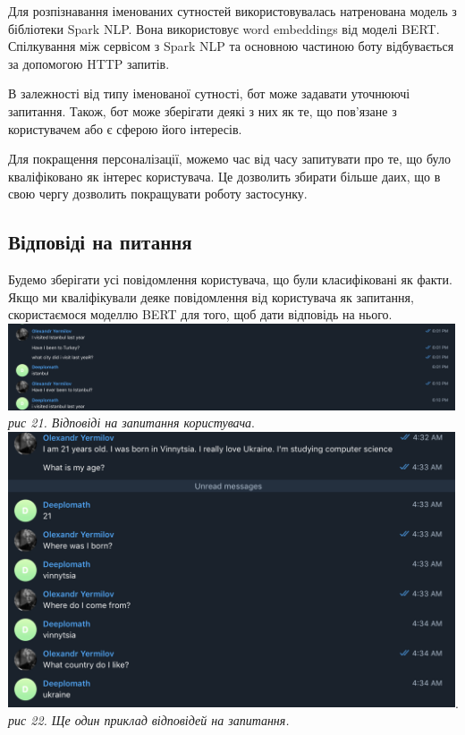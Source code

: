 Для розпізнавання іменованих сутностей використовувалась натренована модель з бібліотеки Spark NLP. Вона використовує word embeddings від моделі BERT. Спілкування між сервісом з Spark NLP та основною частиною боту відбувається за допомогою HTTP запитів.

В залежності від типу іменованої сутності, бот може задавати уточнюючі запитання. Також, бот може зберігати деякі з них як те, що пов'язане з користувачем або є сферою його інтересів.

Для покращення персоналізації, можемо час від часу запитувати про те, що було кваліфіковано як інтерес користувача. Це дозволить збирати більше даих, що в свою чергу дозволить покращувати роботу застосунку.
\subsection{Відповіді на питання}
Будемо зберігати усі повідомлення користувача, що були класифіковані як факти. 
Якщо ми кваліфікували деяке повідомлення від користувача як запитання, скористаємося моделлю BERT для того, щоб дати відповідь на нього. \\
\includegraphics[width = 500]{Dissertation/bert_another.png}\\
\textit{рис 21. Відповіді на запитання користувача}.\\
\includegraphics[width=500]{Dissertation/Bert_Example_1.png}.\\
\textit{рис 22. Ще один приклад відповідей на запитання.}

